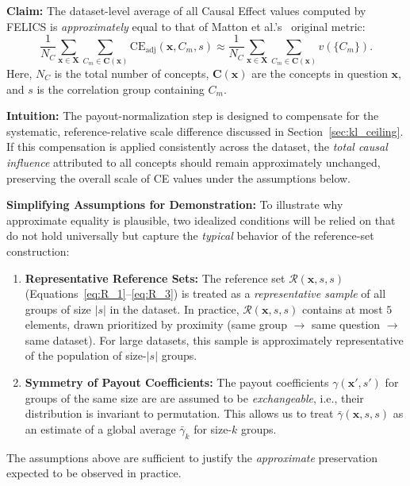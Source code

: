 \begin{math_box}[label=ma:dataset_average_preservation]
	\textbf{Claim:} The dataset-level average of all Causal Effect values computed by FELICS is \emph{approximately} equal to that of Matton et al.'s~\cite{mattonWalkTalkMeasuring2024} original metric:
	\begin{equation*}
		\frac{1}{N_C} \sum_{\mathbf{x} \in \mathbf{X}} \sum_{C_m \in \mathbf{C}(\mathbf{x})} \mathrm{CE}_{\text{adj}}(\mathbf{x}, C_m, s) \approx \frac{1}{N_C} \sum_{\mathbf{x} \in \mathbf{X}} \sum_{C_m \in \mathbf{C}(\mathbf{x})} v(\{C_m\}).
	\end{equation*}
	Here, $N_C$ is the total number of concepts, $\mathbf{C}(\mathbf{x})$ are the concepts in question $\mathbf{x}$, and $s$ is the correlation group containing $C_m$.

	\smallskip
	\textbf{Intuition:} The payout-normalization step is designed to compensate for the systematic, reference-relative scale difference discussed in Section~\ref{sec:kl_ceiling}. If this compensation is applied consistently across the dataset, the \emph{total causal influence} attributed to all concepts should remain approximately unchanged, preserving the overall scale of CE values under the assumptions below.

	\smallskip
	\textbf{Simplifying Assumptions for Demonstration:} To illustrate why approximate equality is plausible, two idealized conditions will be relied on that do not hold universally but capture the \emph{typical} behavior of the reference-set construction:
	\begin{enumerate}
		\item \textbf{Representative Reference Sets:} The reference set $\mathcal{R}(\mathbf{x},s,s)$ (Equations~\ref{eq:R_1}--\ref{eq:R_3}) is treated as a \emph{representative sample} of all groups of size $|s|$ in the dataset. In practice, $\mathcal{R}(\mathbf{x},s,s)$ contains at most $5$ elements, drawn prioritized by proximity (same group $\rightarrow$ same question $\rightarrow$ same dataset). For large datasets, this sample is approximately representative of the population of size-$|s|$ groups.

		\item \textbf{Symmetry of Payout Coefficients:} The payout coefficients $\gamma(\mathbf{x}',s')$ for groups of the same size are are assumed to be \emph{exchangeable}, i.e., their distribution is invariant to permutation. This allows us to treat $\bar\gamma(\mathbf{x},s,s)$ as an estimate of a global average $\bar\gamma_k$ for size-$k$ groups.
	\end{enumerate}
	The assumptions above are sufficient to justify the \emph{approximate} preservation expected to be observed in practice.


\end{math_box}
